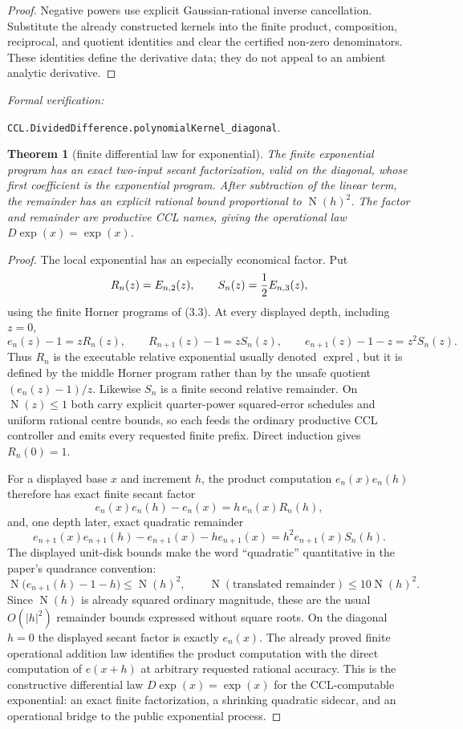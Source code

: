 \documentclass[10pt]{article}
\newtheorem{theorem}{Theorem}[section]
\theoremstyle{definition}
\theoremstyle{remark}
\newcommand{\Norm}{\operatorname{N}}
\newcommand{\leanref}[1]{\par\smallskip\noindent
  \emph{Formal verification:}\par\nobreak
  {\raggedright\nolinkurl{#1}.\par}}
\begin{document}
\begin{proof}
Negative powers use explicit Gaussian-rational inverse cancellation.
Substitute the already constructed kernels into the finite product,
composition, reciprocal, and quotient identities and clear the certified
non-zero denominators.  These identities define the derivative data; they do
not appeal to an ambient analytic derivative.
\end{proof}

\leanref{CCL.DividedDifference.polynomialKernel_diagonal}

\begin{theorem}[finite differential law for exponential]
The finite exponential program has an exact two-input secant factorization,
valid on the diagonal, whose first coefficient is the exponential program.
After subtraction of the linear term, the remainder has an explicit rational
bound proportional to $\Norm(h)^2$.  The factor and remainder are productive
CCL names, giving the operational law $D\exp(x)=\exp(x)$.
\end{theorem}

\begin{proof}
The local exponential has an especially economical factor.  Put
\[
 R_n(z)=E_{n,2}(z),
 \qquad S_n(z)={1\over2}E_{n,3}(z),
\]
using the finite Horner programs of (3.3).  At every displayed depth,
including $z=0$,
\[
 e_n(z)-1=zR_n(z),
 \qquad R_{n+1}(z)-1=zS_n(z),
 \qquad e_{n+1}(z)-1-z=z^2S_n(z).
 \tag{3.31o}
\]
Thus $R_n$ is the executable relative exponential usually denoted
$\operatorname{exprel}$, but it is defined by the middle Horner program rather
than by the unsafe quotient $(e_n(z)-1)/z$.  Likewise $S_n$ is a finite second
relative remainder.  On $\Norm(z)\le1$ both carry explicit quarter-power
squared-error schedules and uniform rational centre bounds, so each feeds the
ordinary productive CCL controller and emits every requested finite prefix.
Direct induction gives $R_n(0)=1$.

For a displayed base $x$ and increment $h$, the product computation
$e_n(x)e_n(h)$ therefore has exact finite secant factor
\[
 e_n(x)e_n(h)-e_n(x)
 =h\,e_n(x)R_n(h),
\]
and, one depth later, exact quadratic remainder
\[
 e_{n+1}(x)e_{n+1}(h)-e_{n+1}(x)-h e_{n+1}(x)
 =h^2e_{n+1}(x)S_n(h).
 \tag{3.31p}
\]
The displayed unit-disk bounds make the word ``quadratic'' quantitative in
the paper's quadrance convention:
\[
 \Norm\bigl(e_{n+1}(h)-1-h\bigr)\le \Norm(h)^2,
 \qquad
 \Norm(\text{translated remainder})\le10\Norm(h)^2.
\]
Since $\Norm(h)$ is already squared ordinary magnitude, these are the usual
$O(|h|^2)$ remainder bounds expressed without square roots.
On the diagonal $h=0$ the displayed secant factor is exactly $e_n(x)$.
The already proved finite operational addition law identifies the product
computation with the direct computation of $e(x+h)$ at arbitrary requested
rational accuracy.  This is the constructive differential law
$D\exp(x)=\exp(x)$ for the CCL-computable exponential: an exact finite
factorization, a shrinking quadratic sidecar, and an operational bridge to
the public exponential process.
\end{proof}
\end{document}

